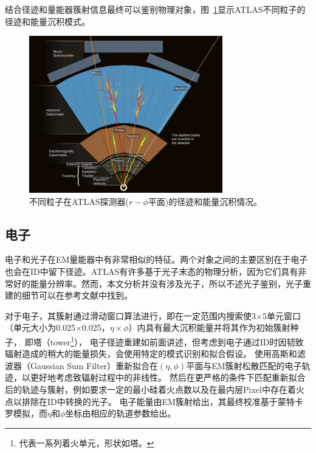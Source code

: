 结合径迹和量能器簇射信息最终可以鉴别物理对象，图~\ref{fig:particle_id_patterns}显示ATLAS不同粒子的径迹和能量沉积模式。
\begin{figure}
\centering
\includegraphics[width=0.75\textwidth]{fig/particle_ID_patterns.png}
\caption{不同粒子在ATLAS探测器($r-\phi$平面)的径迹和能量沉积情况。}
\label{fig:particle_id_patterns}
\end{figure}

\subsection{电子}
电子和光子在EM量能器中有非常相似的特征。两个对象之间的主要区别在于电子也会在ID中留下径迹。ATLAS有许多基于光子末态的物理分析，因为它们具有非常好的能量分辨率。然而，本文分析并没有涉及光子，所以不述光子鉴别，光子重建的细节可以在参考文献\cite{ATLAS-CONF-2012-123}中找到。

对于电子，其簇射通过滑动窗口算法进行\cite{Lampl:1099735}，即在一定范围内搜索使3$\times$5单元窗口（单元大小为0.025$\times$0.025，$\eta\times\phi$）内具有最大沉积能量并将其作为初始簇射种子，
即塔（tower\footnote{
代表一系列着火单元，形状如塔。
}），
电子径迹重建如前面讲述，但考虑到电子通过ID时因韧致辐射造成的稍大的能量损失，会使用特定的模式识别和拟合假设。
使用高斯和滤波器（Gaussian Sum Filter）\cite{ATLAS-CONF-2012-047}重新拟合在$(\eta,\phi)$平面与EM簇射松散匹配的电子轨迹，以更好地考虑致辐射过程中的非线性。 然后在更严格的条件下匹配重新拟合后的轨迹与簇射，例如要求一定的最小硅着火点数以及在最内层Pixel中存在着火点以排除在ID中转换的光子。 电子能量由EM簇射给出，其最终校准基于蒙特卡罗模拟\cite{Aad2014-cali}，而$\eta$和$\phi$坐标由相应的轨道参数给出。

